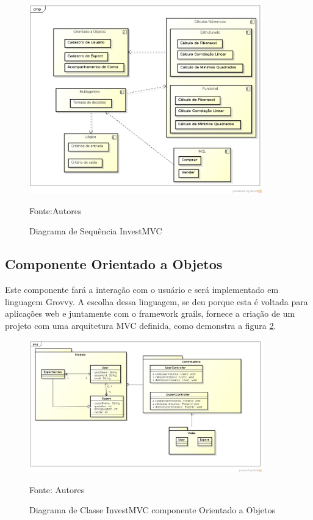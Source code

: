 \begin{figure}[htp]
\centering
\includegraphics[width=0.9\textwidth]{figuras/componente}
\caption{Diagrama de Sequência InvestMVC}{Fonte:Autores}
\label{componente}
\end{figure}

\subsection{Componente Orientado a Objetos}

Este componente fará a interação com o usuário e será implementado em linguagem Grovvy. A escolha dessa linguagem, se deu porque esta é voltada para aplicações web e juntamente com  o framework grails, fornece a criação de um projeto com uma arquitetura MVC definida, como demonstra a figura \ref{classeOO}.

\begin{figure}[htp]
\centering
\includegraphics[width=0.9\textwidth]{figuras/classeOO}
\caption{Diagrama de Classe InvestMVC componente Orientado a Objetos}{Fonte: Autores} 
\label{classeOO}
\end{figure}

